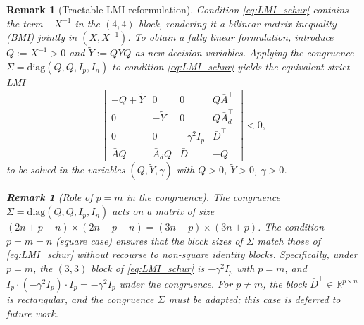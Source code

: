 \documentclass[10pt]{amsart}
\numberwithin{equation}{section}
\newtheorem{remark}[theorem]{Remark}
\begin{document}
\begin{remark}[Tractable LMI reformulation]\label{rem:LMI_linear}
Condition \eqref{eq:LMI_schur} contains the term $-X^{-1}$ in the $(4,4)$-block,
rendering it a \emph{bilinear matrix inequality} (BMI) jointly in $(X, X^{-1})$. To
obtain a fully linear formulation, introduce $Q := X^{-1} > 0$ and
$\tilde{Y} := QYQ$ as new decision variables. Applying the congruence
$\Sigma = \mathrm{diag}(Q, Q, I_p, I_n)$ to condition \eqref{eq:LMI_schur} yields
the equivalent strict LMI
\begin{equation}\label{eq:LMI_linear}
\begin{bmatrix}
-Q+\tilde{Y} & 0 & 0 & Q\bar{A}^\top \\
0 & -\tilde{Y} & 0 & Q\bar{A}_d^\top \\
0 & 0 & -\gamma^2 I_p & \bar{D}^\top \\
\bar{A}Q & \bar{A}_dQ & \bar{D} & -Q
\end{bmatrix} < 0,
\end{equation}
to be solved in the variables $(Q, \tilde{Y}, \gamma)$ with $Q > 0$, $\tilde{Y} > 0$,
$\gamma > 0$.

\begin{remark}[Role of $p = m$ in the congruence]\label{rem:congruence_dim}
The congruence $\Sigma = \mathrm{diag}(Q, Q, I_p, I_n)$ acts on a matrix of size
$(2n+p+n) \times (2n+p+n) = (3n+p) \times (3n+p)$. The condition $p = m = n$ (square
case) ensures that the block sizes of $\Sigma$ match those of \eqref{eq:LMI_schur}
without recourse to non-square identity blocks. Specifically, under $p = m$, the
$(3,3)$ block of \eqref{eq:LMI_schur} is $-\gamma^2 I_p$ with $p = m$, and
$I_p \cdot (-\gamma^2 I_p) \cdot I_p = -\gamma^2 I_p$ under the congruence. For
$p \neq m$, the block $\bar{D}^\top \in \mathbb{R}^{p \times n}$ is rectangular, and
the congruence $\Sigma$ must be adapted; this case is deferred to future work.
\end{remark}


\end{remark}
\end{document}

